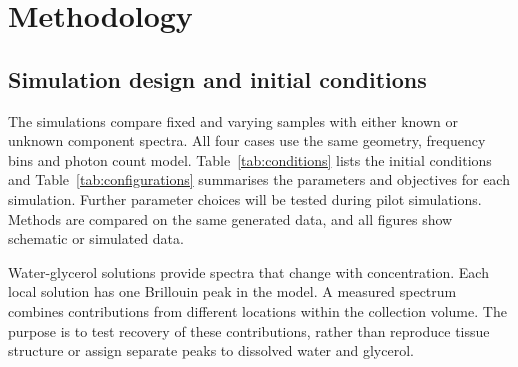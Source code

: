 \documentclass[11pt]{article}
\begin{document}
\clearpage

\section{Methodology}

\subsection{Simulation design and initial conditions}
\label{sec:design}

The simulations compare fixed and varying samples with either known or unknown component spectra. All four cases use the same geometry, frequency bins and photon count model. Table~\ref{tab:conditions} lists the initial conditions and Table~\ref{tab:configurations} summarises the parameters and objectives for each simulation. Further parameter choices will be tested during pilot simulations. Methods are compared on the same generated data, and all figures show schematic or simulated data.

Water-glycerol solutions provide spectra that change with concentration. Each local solution has one Brillouin peak in the model. A measured spectrum combines contributions from different locations within the collection volume. The purpose is to test recovery of these contributions, rather than reproduce tissue structure or assign separate peaks to dissolved water and glycerol.
\end{document}
